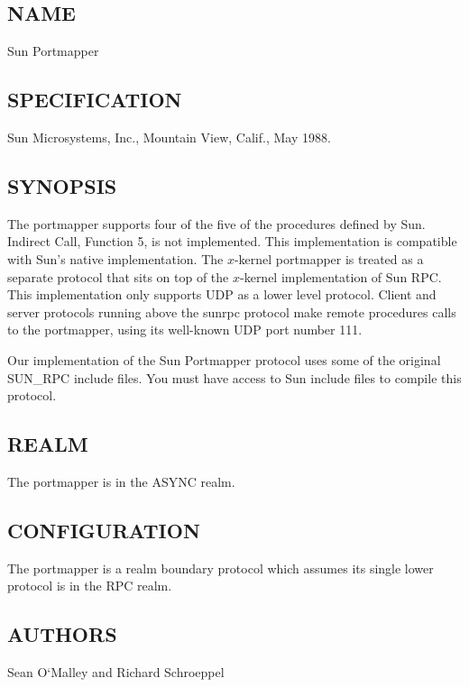 %

\subsection*{NAME}

\noindent Sun Portmapper

\subsection*{SPECIFICATION}

Sun Microsystems, Inc., Mountain View, Calif., May 1988.

\subsection*{SYNOPSIS}

\noindent The portmapper supports four of the five of the
procedures defined by Sun.  Indirect Call, Function 5, is
not implemented.  This implementation is compatible with
Sun's native implementation.  The $x$-kernel portmapper is
treated as a separate protocol that sits on top of the
$x$-kernel implementation of Sun RPC.  This implementation
only supports UDP as a lower level protocol.  Client and
server protocols running above the sunrpc protocol make
remote procedures calls to the portmapper, using its
well-known UDP port number 111.

Our implementation of the Sun Portmapper protocol uses some
of the original SUN\_RPC include files.  You must have access
to Sun include files to compile this protocol.

\subsection*{REALM}

The portmapper is in the ASYNC realm.

\subsection*{CONFIGURATION}

The portmapper is a realm boundary protocol which assumes its single
lower protocol is in the RPC realm.



\subsection*{AUTHORS}

\noindent Sean O`Malley and Richard Schroeppel
